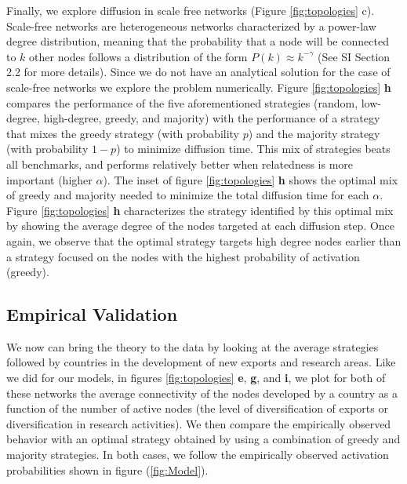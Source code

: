 \documentclass[preprint,superscriptaddress,floatfix]{article}
\begin{document}
Finally, we explore diffusion in scale free networks \cite{barabasi1999emergence} (Figure \ref{fig:topologies} c). Scale-free networks are heterogeneous networks characterized by a power-law degree distribution, meaning that the probability that a node will be connected to $k$ other nodes follows a distribution of the form $P(k) \approx k^{-\gamma}$ (See SI Section 2.2 for more details). Since we do not have an analytical solution for the case of scale-free networks we explore the problem numerically. Figure \ref{fig:topologies} \textbf{h} compares the performance of the five aforementioned strategies (random, low-degree, high-degree, greedy, and majority) with the performance of a strategy that mixes the greedy strategy (with probability $p$) and the majority strategy (with probability $1-p$) to minimize diffusion time. This mix of strategies beats all benchmarks, and performs relatively better when relatedness is more important (higher $\alpha$). The inset of figure \ref{fig:topologies} \textbf{h} shows the optimal mix of greedy and majority needed to minimize the total diffusion time for each $\alpha$. Figure \ref{fig:topologies} \textbf{h} characterizes the strategy identified by this optimal mix by showing the average degree of the nodes targeted at each diffusion step. Once again, we observe that the optimal strategy targets high degree nodes earlier than a strategy focused on the nodes with the highest probability of activation (greedy).

\subsection*{Empirical Validation}

We now can bring the theory to the data by looking at the average strategies followed by countries in the development of new exports and research areas. Like we did for our models, in figures \ref{fig:topologies} \textbf{e}, \textbf{g}, and \textbf{i}, we plot for both of these networks the average connectivity of the nodes developed by a country as a function of the number of active nodes (the level of diversification of exports or diversification in research activities). We then compare the empirically observed behavior with an optimal strategy obtained by using a combination of greedy and majority strategies. In both cases, we follow the empirically observed activation probabilities shown in figure (\ref{fig:Model}).
\end{document}
